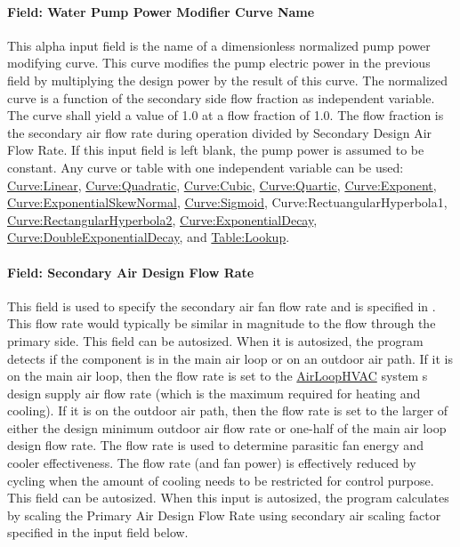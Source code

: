 \paragraph{Field: Water Pump Power Modifier Curve Name}\label{field-water-pump-power-modifier-curve-name-1}

This alpha input field is the name of a dimensionless normalized pump power modifying curve. This curve modifies the pump electric power in the previous field by multiplying the design power by the result of this curve. The normalized curve is a function of the secondary side flow fraction as independent variable. The curve shall yield a value of 1.0 at a flow fraction of 1.0. The flow fraction is the secondary air flow rate during operation divided by Secondary Design Air Flow Rate. If this input field is left blank, the pump power is assumed to be constant. Any curve or table with one independent variable can be used: \hyperref[curvelinear]{Curve:Linear}, \hyperref[curvequadratic]{Curve:Quadratic}, \hyperref[curvecubic]{Curve:Cubic}, \hyperref[curvequartic]{Curve:Quartic}, \hyperref[curveexponent]{Curve:Exponent}, \hyperref[curveexponentialskewnormal]{Curve:ExponentialSkewNormal}, \hyperref[curvesigmoid]{Curve:Sigmoid}, Curve:RectuangularHyperbola1, \hyperref[curverectangularhyperbola2]{Curve:RectangularHyperbola2}, \hyperref[curveexponentialdecay]{Curve:ExponentialDecay}, \hyperref[curvedoubleexponentialdecay]{Curve:DoubleExponentialDecay}, and \hyperref[tablelookup]{Table:Lookup}.

\paragraph{Field: Secondary Air Design Flow Rate}\label{field-secondary-air-design-flow-rate}

This field is used to specify the secondary air fan flow rate and is specified in \si{\volumeFlowRate}. This flow rate would typically be similar in magnitude to the flow through the primary side. This field can be autosized. When it is autosized, the program detects if the component is in the main air loop or on an outdoor air path. If it is on the main air loop, then the flow rate is set to the \hyperref[airloophvac]{AirLoopHVAC} system s design supply air flow rate (which is the maximum required for heating and cooling). If it is on the outdoor air path, then the flow rate is set to the larger of either the design minimum outdoor air flow rate or one-half of the main air loop design flow rate. The flow rate is used to determine parasitic fan energy and cooler effectiveness. The flow rate (and fan power) is effectively reduced by cycling when the amount of cooling needs to be restricted for control purpose. This field can be autosized. When this input is autosized, the program calculates by scaling the Primary Air Design Flow Rate using secondary air scaling factor specified in the input field below.

